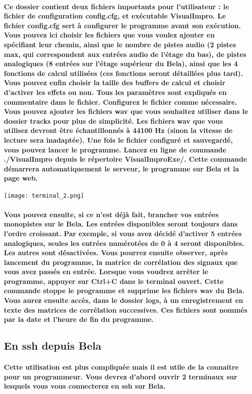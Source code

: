 \documentclass[a4paper]{article}
\begin{document}
\paragraph{Ce dossier contient deux fichiers importants pour l’utilisateur : le
fichier de configuration config.cfg, et exécutable VisualImpro. Le fichier
config.cfg sert à configurer le programme avant son exécution. Vous pouvez ici
choisir les fichiers que vous voulez ajouter en spécifiant leur chemin, ainsi
que le nombre de pistes audio (2 pistes max, qui correspondent aux entrées audio
de l’étage du bas), de pistes analogiques (8 entrées sur l’étage supérieur du
Bela), ainsi que les 4 fonctions de calcul utilisées (ces fonctions seront
détaillées plus tard). Vous pouvez enfin choisir la taille des buffers de calcul
et choisir d’activer les effets ou non. Tous les paramètres sont expliqués en
commentaire dans le fichier. Configurez le fichier comme nécessaire. Vous pouvez
ajouter les fichiers wav que vous souhaitez utiliser dans le dossier tracks pour
plus de simplicité. Les fichiers wav que vous utilisez devront être
échantillonnés à 44100 Hz (sinon la vitesse de lecture sera inadaptée). Une fois
le fichier configuré et sauvegardé, vous pouvez lancer le programme. Lancez en
ligne de commande ./VisualImpro depuis le répertoire VisualImproExe/. Cette
commande démarrera automatiquement le serveur, le programme sur Bela et la page
web.}

\texttt{[image: terminal\_2.png]}

\paragraph{Vous pouvez ensuite, si ce n’est déjà fait, brancher vos entrées
monopistes sur le Bela. Les entrées disponibles seront toujours dans l’ordre
croissant. Par exemple, si vous avez décidé d’activer 5 entrées analogiques,
seules les entrées numérotées de 0 à 4 seront disponibles. Les autres sont
désactivées. Vous pourrez ensuite observer, après lancement du programme, la
matrice de corrélation des signaux que vous avez passés en entrée. Lorsque vous
voudrez arrêter le programme, appuyer sur Ctrl+C dans le terminal ouvert. Cette
commande stoppe le programme et supprime les fichiers wav du Bela. Vous aurez
ensuite accès, dans le dossier logs, à un enregistrement en texte des matrices
de corrélation successives. Ces fichiers sont nommés par la date et l’heure de
fin du programme.}

\subsection{En ssh depuis Bela} \paragraph{Cette utilisation est plus compliquée
mais il est utile de la connaitre pour un programmeur. Vous devrez d’abord
ouvrir 2 terminaux sur lesquels vous vous connecterez en ssh sur
Bela.\newline\newline}
\end{document}
